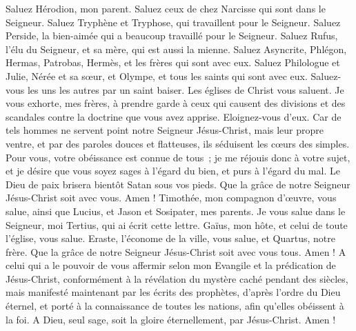 \begin{multicols}{2}
Saluez Hérodion, mon parent. Saluez ceux de chez Narcisse qui sont dans le Seigneur.
Saluez Tryphène et Tryphose, qui travaillent pour le Seigneur. Saluez Perside, la bien-aimée qui a beaucoup travaillé pour le Seigneur.
Saluez Rufus, l’élu du Seigneur, et sa mère, qui est aussi la mienne.
Saluez Asyncrite, Phlégon, Hermas, Patrobas, Hermès, et les frères qui sont avec eux.
Saluez Philologue et Julie, Nérée et sa sœur, et Olympe, et tous les saints qui sont avec eux.
Saluez-vous les uns les autres par un saint baiser. Les églises de Christ vous saluent.
Je vous exhorte, mes frères, à prendre garde à ceux qui causent des divisions et des scandales contre la doctrine que vous avez apprise. Eloignez-vous d'eux.
Car de tels hommes ne servent point notre Seigneur Jésus-Christ, mais leur propre ventre, et par des paroles douces et flatteuses, ils séduisent les cœurs des simples.
Pour vous, votre obéissance est connue de tous ; je me réjouis donc à votre sujet, et je désire que vous soyez sages à l’égard du bien, et purs à l’égard du mal.
Le Dieu de paix brisera bientôt Satan sous vos pieds. Que la grâce de notre Seigneur Jésus-Christ soit avec vous. Amen !
Timothée, mon compagnon d’œuvre, vous salue, ainsi que Lucius, et Jason et Sosipater, mes parents.
Je vous salue dans le Seigneur, moi Tertius, qui ai écrit cette lettre.
Gaïus, mon hôte, et celui de toute l'église, vous salue. Eraste, l’économe de la ville, vous salue, et Quartus, notre frère.
Que la grâce de notre Seigneur Jésus-Christ soit avec vous tous. Amen !
A celui qui a le pouvoir de vous affermir selon mon Evangile et la prédication de Jésus-Christ, conformément à la révélation du mystère caché pendant des siècles,
mais manifesté maintenant par les écrits des prophètes, d’après l’ordre du Dieu éternel, et porté à la connaissance de toutes les nations, afin qu’elles obéissent à la foi.
A Dieu, seul sage, soit la gloire éternellement, par Jésus-Christ. Amen !
\PPE{}
\end{multicols}
